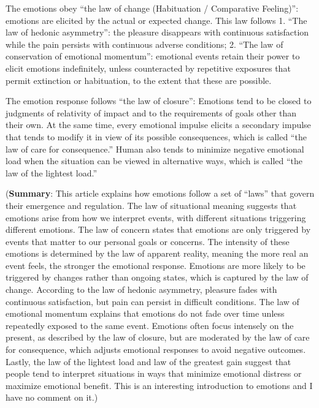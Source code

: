 \documentclass[11pt]{elegantbook}
\begin{document}
The emotions obey ``the law of change (Habituation / Comparative Feeling)'': emotions are elicited by the actual or expected change. This law follows 1. ``The law of hedonic asymmetry'': the pleasure disappears with continuous satisfaction while the pain persists with continuous adverse conditions; 2. ``The law of conservation of emotional momentum'':  emotional events retain their power to elicit emotions indefinitely, unless counteracted by repetitive exposures that permit extinction or habituation, to the extent that these are possible.

The emotion response follows ``the law of closure'': Emotions tend to be closed to judgments of relativity of impact and to the requirements of goals other than their own. At the same time, every emotional impulse elicits a secondary impulse that tends to modify it in view of its possible consequences, which is called ``the law of care for consequence.'' Human also tends to minimize negative emotional load when the situation can be viewed in alternative ways, which is called ``the law of the lightest load.''

(\textbf{Summary}: This article explains how emotions follow a set of “laws” that govern their emergence and regulation. The law of situational meaning suggests that emotions arise from how we interpret events, with different situations triggering different emotions. The law of concern states that emotions are only triggered by events that matter to our personal goals or concerns. The intensity of these emotions is determined by the law of apparent reality, meaning the more real an event feels, the stronger the emotional response. Emotions are more likely to be triggered by changes rather than ongoing states, which is captured by the law of change. According to the law of hedonic asymmetry, pleasure fades with continuous satisfaction, but pain can persist in difficult conditions. The law of emotional momentum explains that emotions do not fade over time unless repeatedly exposed to the same event. Emotions often focus intensely on the present, as described by the law of closure, but are moderated by the law of care for consequence, which adjusts emotional responses to avoid negative outcomes. Lastly, the law of the lightest load and law of the greatest gain suggest that people tend to interpret situations in ways that minimize emotional distress or maximize emotional benefit. This is an interesting introduction to emotions and I have no comment on it.)
\end{document}
